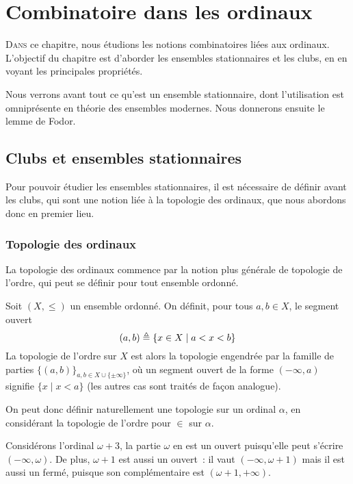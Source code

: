 \chapter{Combinatoire dans les ordinaux}
\label{chp.combi}

\minitoc

\lettrine{D}{ans} ce chapitre, nous étudions les notions combinatoires liées aux
ordinaux. L'objectif du chapitre est d'aborder les ensembles stationnaires et
les clubs, en en voyant les principales propriétés.

Nous verrons avant tout ce qu'est un ensemble stationnaire, dont l'utilisation
est omniprésente en théorie des ensembles modernes. Nous donnerons ensuite le
lemme de Fodor.

\section{Clubs et ensembles stationnaires}

Pour pouvoir étudier les ensembles stationnaires, il est nécessaire de définir
avant les clubs, qui sont une notion liée à la topologie des ordinaux, que nous
abordons donc en premier lieu.

\subsection{Topologie des ordinaux}

La topologie des ordinaux commence par la notion plus générale de topologie de
l'ordre, qui peut se définir pour tout ensemble ordonné.

\begin{definition}
  Soit $(X,\leq)$ un ensemble ordonné. On définit, pour tous $a,b\in X$, le
  segment ouvert
  \[(a,b) \triangleq \{x \in X \mid a < x < b\}\]
  La topologie de l'ordre sur $X$ est alors la topologie engendrée par la
  famille de parties $\{(a,b)\}_{a,b\in X\cup\{\pm\infty\}}$, où un segment ouvert de
  la forme $(-\infty,a)$ signifie $\{x \mid x < a\}$ (les autres cas sont
  traités de façon analogue).
\end{definition}

On peut donc définir naturellement une topologie sur un ordinal $\alpha$, en
considérant la topologie de l'ordre pour $\in$ sur $\alpha$.

\begin{example}
  Considérons l'ordinal $\omega + 3$, la partie $\omega$ en est un ouvert
  puisqu'elle peut s'écrire $(-\infty, \omega)$. De plus, $\omega + 1$ est aussi
  un ouvert~: il vaut $(-\infty, \omega+1)$ mais il est aussi un fermé,
  puisque son complémentaire est $(\omega + 1, +\infty)$.
\end{example}

